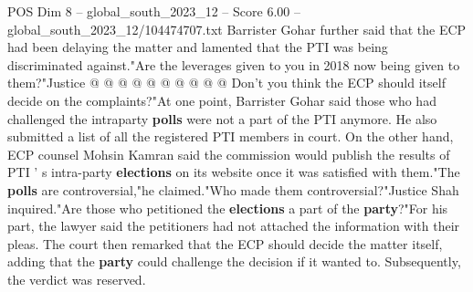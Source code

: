 \begin{textsample}{POS Dim 8 – global\_south\_2023\_12 – Score 6.00 – global\_south\_2023\_12/104474707.txt}
Barrister Gohar further said that the ECP had been delaying the matter and lamented that the PTI was being discriminated against."Are the leverages given to you in 2018 now being given to them?"Justice @ @ @ @ @ @ @ @ @ @ Don't you think the ECP should itself decide on the complaints?"At one point, Barrister Gohar said those who had challenged the intraparty \textbf{polls} were not a part of the PTI anymore.
He also submitted a list of all the registered PTI members in court.
On the other hand, ECP counsel Mohsin Kamran said the commission would publish the results of PTI ' s intra-party \textbf{elections} on its website once it was satisfied with them."The \textbf{polls} are controversial,"he claimed."Who made them controversial?"Justice Shah inquired."Are those who petitioned the \textbf{elections} a part of the \textbf{party}?"For his part, the lawyer said the petitioners had not attached the information with their pleas.
The court then remarked that the ECP should decide the matter itself, adding that the \textbf{party} could challenge the decision if it wanted to.
Subsequently, the verdict was reserved.

\end{textsample}
